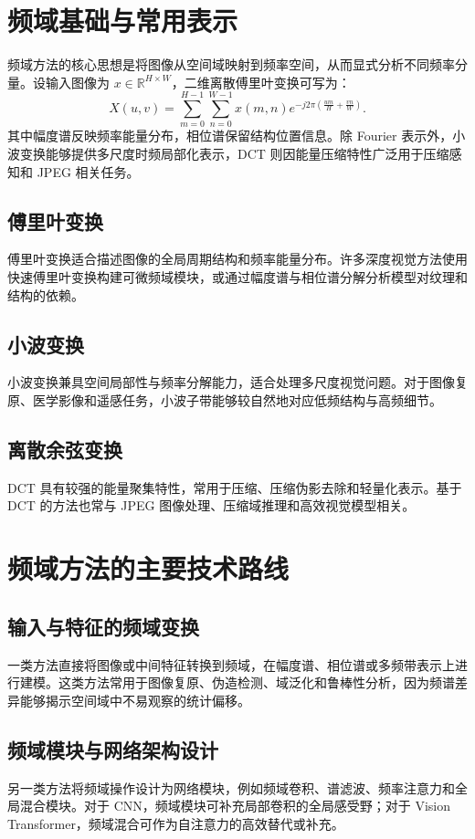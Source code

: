 \documentclass[12pt,a4paper]{article}
\begin{document}
\section{频域基础与常用表示}
频域方法的核心思想是将图像从空间域映射到频率空间，从而显式分析不同频率分量。设输入图像为 $x\in\mathbb{R}^{H\times W}$，二维离散傅里叶变换可写为：
\begin{equation}
X(u,v)=\sum_{m=0}^{H-1}\sum_{n=0}^{W-1}x(m,n)e^{-j2\pi(\frac{um}{H}+\frac{vn}{W})}.
\end{equation}
其中幅度谱反映频率能量分布，相位谱保留结构位置信息。除 Fourier 表示外，小波变换能够提供多尺度时频局部化表示，DCT 则因能量压缩特性广泛用于压缩感知和 JPEG 相关任务。

\subsection{傅里叶变换}
傅里叶变换适合描述图像的全局周期结构和频率能量分布。许多深度视觉方法使用快速傅里叶变换构建可微频域模块，或通过幅度谱与相位谱分解分析模型对纹理和结构的依赖。

\subsection{小波变换}
小波变换兼具空间局部性与频率分解能力，适合处理多尺度视觉问题。对于图像复原、医学影像和遥感任务，小波子带能够较自然地对应低频结构与高频细节。

\subsection{离散余弦变换}
DCT 具有较强的能量聚集特性，常用于压缩、压缩伪影去除和轻量化表示。基于 DCT 的方法也常与 JPEG 图像处理、压缩域推理和高效视觉模型相关。

\section{频域方法的主要技术路线}
\subsection{输入与特征的频域变换}
一类方法直接将图像或中间特征转换到频域，在幅度谱、相位谱或多频带表示上进行建模。这类方法常用于图像复原、伪造检测、域泛化和鲁棒性分析，因为频谱差异能够揭示空间域中不易观察的统计偏移。

\subsection{频域模块与网络架构设计}
另一类方法将频域操作设计为网络模块，例如频域卷积、谱滤波、频率注意力和全局混合模块。对于 CNN，频域模块可补充局部卷积的全局感受野；对于 Vision Transformer，频域混合可作为自注意力的高效替代或补充。
\end{document}
